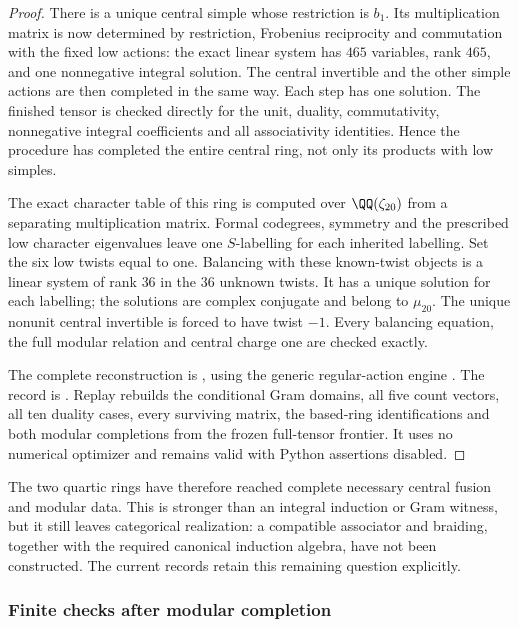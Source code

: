 \begin{proof}
There is a unique central simple whose restriction is $b_1$. Its
multiplication matrix is now determined by restriction, Frobenius
reciprocity and commutation with the fixed low actions: the exact
linear system has $465$ variables, rank $465$, and one nonnegative
integral solution. The central invertible and the other simple actions
are then completed in the same way. Each step has one solution.
The finished tensor is checked directly for the unit, duality,
commutativity, nonnegative integral coefficients and all associativity
identities. Hence the procedure has completed the entire central ring,
not only its products with low simples.

The exact character table of this ring is computed over
$\QQ(\zeta_{20})$ from a separating multiplication matrix. Formal
codegrees, symmetry and the prescribed low character eigenvalues leave
one $S$-labelling for each inherited labelling. Set the six low twists
equal to one. Balancing with these known-twist objects is a linear
system of rank $36$ in the $36$ unknown twists. It has a unique solution
for each labelling; the solutions are complex conjugate and belong to
$\mu_{20}$. The unique nonunit central invertible is forced to have twist $-1$.
Every balancing equation, the full
modular relation and central charge one are checked exactly.

The complete reconstruction is
, using the generic
regular-action engine .
The record is
.
Replay rebuilds the conditional Gram domains, all five count vectors,
all ten duality cases, every surviving matrix, the based-ring
identifications and both modular completions from the frozen full-tensor
frontier. It uses no numerical optimizer and remains valid with Python
assertions disabled.
\end{proof}

The two quartic rings have therefore reached complete necessary central
fusion and modular data. This is stronger than an integral induction or
Gram witness, but it still leaves categorical realization: a compatible
associator and braiding, together with the required canonical induction
algebra, have not been constructed. The current records retain this
remaining question explicitly.

\subsubsection{Finite checks after modular completion}

